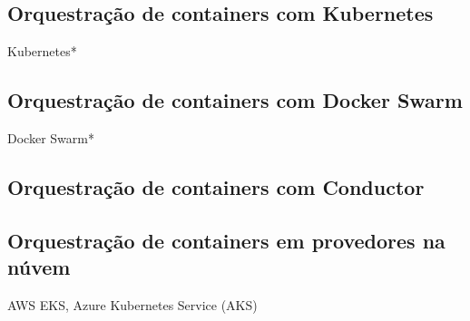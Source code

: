 
\subsection{Orquestração de containers com Kubernetes}
Kubernetes*

\subsection{Orquestração de containers com Docker Swarm}
Docker Swarm*

\subsection{Orquestração de containers com Conductor}

\subsection{Orquestração de containers em provedores na núvem}
AWS EKS, Azure Kubernetes Service (AKS)







